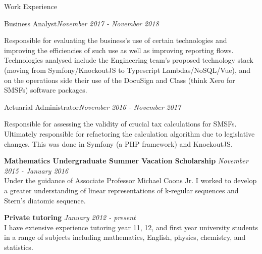\documentclass{resume} %
\begin{document}
\begin{rSection}{Work Experience}
\begin{adjustwidth}{2em}{}
    \begin{rSubsection}{Business Analyst}{\em November 2017 - November 2018}{}{}
    \item Responsible for evaluating the business's use of certain technologies and improving the efficiencies of such use as well as improving reporting flows. Technologies analysed include the Engineering team's proposed technology stack (moving from Symfony/KnockoutJS to Typescript Lambdas/NoSQL/Vue), and on the operations side their use of the DocuSign and Class (think Xero for SMSFs) software packages.
    \end{rSubsection}

    \begin{rSubsection}{Actuarial Administrator}{\em November 2016 - November 2017}{}{}
    \item Responsible for assessing the validity of crucial tax calculations for SMSFs. Ultimately responsible for refactoring the calculation algorithm due to legislative changes. This was done in Symfony (a PHP framework) and KnockoutJS.
    \end{rSubsection}
\end{adjustwidth}

{\bf Mathematics Undergraduate Summer Vacation Scholarship} \hfill {\em November 2015 - January 2016} \\
Under the guidance of Associate Professor Michael Coons Jr. I worked to develop a greater understanding of linear representations of k-regular sequences and Stern's diatomic sequence.

{\bf Private tutoring} \hfill {\em January 2012 - present} \\
I have extensive experience tutoring year 11, 12, and first year university students in a range of subjects including mathematics, English, physics, chemistry, and statistics.
\end{rSection}

\newpage
\end{document}
